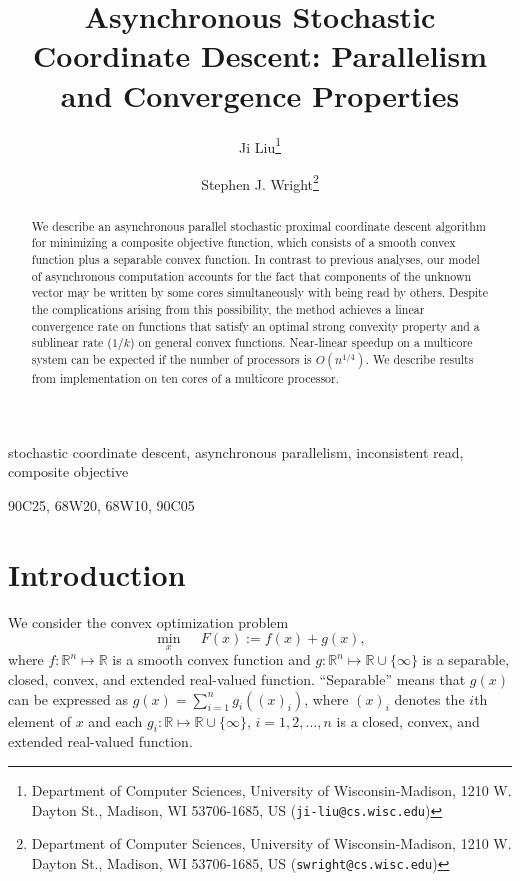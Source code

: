 \documentclass{siamltex}
\title{Asynchronous Stochastic Coordinate Descent: Parallelism and Convergence Properties}
\author{Ji Liu\thanks{Department of Computer Sciences, University of Wisconsin-Madison, 1210 W. Dayton St., Madison, WI 53706-1685, US ({\tt ji-liu@cs.wisc.edu})}
\and Stephen J. Wright\thanks{Department of Computer Sciences, University of Wisconsin-Madison, 1210 W. Dayton St., Madison, WI 53706-1685, US ({\tt swright@cs.wisc.edu})}
}
\begin{document}
\maketitle

\begin{abstract}
We describe an asynchronous parallel stochastic proximal coordinate
descent algorithm for minimizing a composite objective function, which
consists of a smooth convex function plus a separable convex function.
In contrast to previous analyses, our model of asynchronous
computation accounts for the fact that components of the unknown
vector may be written by some cores simultaneously with being read by
others.  Despite the complications arising from this possibility, the
method achieves a linear convergence rate on functions that satisfy an
optimal strong convexity property and a sublinear rate ($1/k$) on
general convex functions. Near-linear speedup on a multicore system
can be expected if the number of processors is $O(n^{1/4})$. We
describe results from implementation on ten cores of a multicore
processor.
\end{abstract}

\begin{keywords}
stochastic coordinate descent, asynchronous parallelism, inconsistent
read, composite objective
\end{keywords}

\begin{AMS}
90C25, 68W20, 68W10, 90C05
\end{AMS}

\pagestyle{myheadings}
\thispagestyle{plain}

\section{Introduction}
\label{sec:intro}

We consider the convex optimization problem
\begin{equation}
\label{eqn_mainproblem}
\min_{x} \, \quad F(x):=f(x) + g(x),
\end{equation}
where $f: \mathbb{R}^n \mapsto \mathbb{R}$ is a smooth convex function
and $g: \mathbb{R}^n \mapsto \mathbb{R}\cup \{\infty\}$ is a
separable, closed, convex, and extended real-valued
function. ``Separable'' means that $g(x)$ can be expressed as $g(x) =
\sum_{i=1}^n g_i((x)_i)$, where $(x)_i$ denotes the $i$th element of
$x$ and each $g_i: \mathbb{R}\mapsto \mathbb{R}\cup\{\infty\}$,
$i=1,2,\dotsc,n$ is a closed, convex, and extended real-valued
function.
\end{document}
